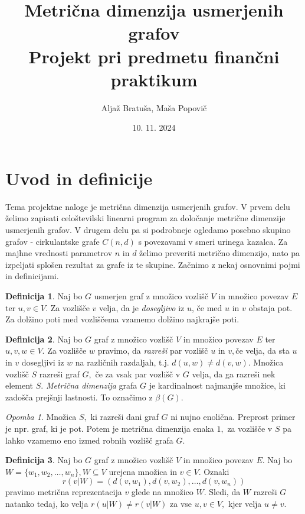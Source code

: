 \documentclass[a4paper,12pt]{article}
\title{%
  Metrična dimenzija usmerjenih grafov \\
  \large Projekt pri predmetu finančni praktikum\\}
\author{Aljaž Bratuša, Maša Popovič}
\date{10. 11. 2024}
\theoremstyle{definition}
\newtheorem{definicija}{Definicija}[section]
\theoremstyle{remark}
\newtheorem*{opomba}{Opomba}
\theoremstyle{definition}
\begin{document}
\maketitle

\section{Uvod in definicije}

Tema projektne naloge je metrična dimenzija usmerjenih grafov. V prvem delu želimo zapisati 
celoštevilski linearni program za določanje metrične dimenzije usmerjenih grafov. V drugem delu 
pa si podrobneje ogledamo posebno skupino grafov - cirkulantske grafe $C(n, d)$ s povezavami v smeri
urinega kazalca. Za majhne vrednosti parametrov $n$ in  $d$ želimo preveriti metrično dimenzijo, nato 
pa izpeljati splošen rezultat za grafe iz te skupine. Začnimo z nekaj osnovnimi pojmi
in definicijami. 

\begin{definicija}
    Naj bo $G$ usmerjen graf z množico vozlišč $V$ in 
    množico povezav $E$ ter $u,v \in V.$ Za vozlišče $v$ velja, da je \textit{dosegljivo}
    iz $u$, če med $u$ in $v$ obstaja pot. Za dolžino poti med vozliščema vzamemo dolžino
    najkrajše poti.
\end{definicija}

\begin{definicija}
    Naj bo $G$ graf z množico vozlišč $V$ in množico povezav $E$ ter $u,v,w \in V.$ Za vozlišče 
    $w$ pravimo, da \textit{razreši} par vozlišč $u$ in $v,$če velja, da sta $u$ in $v$ dosegljivi
    iz $w$ na različnih razdaljah, t.j. $d(u,w) \neq d(v,w).$ Množica vozlišč $S$ razreši graf $G,$ če 
    za vsak par vozlišč v $G$ velja, da ga razreši nek element $S.$ \textit{Metrična dimenzija} grafa $G$
    je kardinalnost najmanjše množice, ki zadošča prejšnji lastnosti. To označimo z $\beta(G).$
\end{definicija}

\begin{opomba}
    Množica $S,$ ki razreši dani graf $G$ ni nujno enolična. Preprost primer je npr. graf, ki je pot. Potem je 
    metrična dimenzija enaka $1,$ za vozlišče v $S$ pa lahko vzamemo eno izmed robnih vozlišč grafa $G.$
\end{opomba}

\begin{definicija}
    Naj bo $G$ graf z množico vozlišč $V$ in množico povezav $E.$
    Naj bo $W = \{w_1, w_2, \dots ,w_n \},  W \subseteq V$ urejena množica in $v \in V.$
    Oznaki $$r(v|W) = (d(v, w_1), d(v, w_2), \dots ,d(v, w_n))$$ pravimo metrična 
    reprezentacija $v$ glede na množico $W.$ Sledi, da $W$ razreši $G$ natanko tedaj, ko velja 
    $r(u|W) \neq r(v|W)$ za vse $u,v \in V,$ kjer velja $u \neq v.$
\end{definicija}
\end{document}
